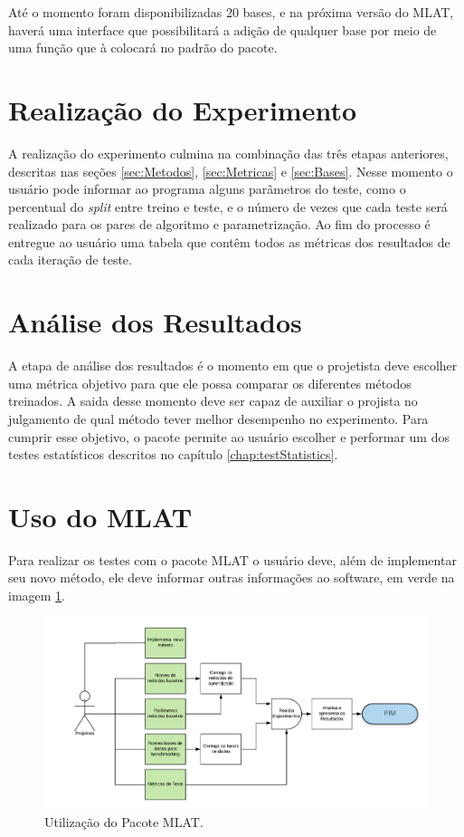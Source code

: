 Até o momento foram disponibilizadas 20 bases, e na próxima versão do MLAT, haverá uma interface que possibilitará a adição de qualquer base por meio de uma função que à colocará no padrão do pacote.

\section{Realização do Experimento}
A realização do experimento culmina na combinação das três etapas anteriores, descritas nas seções \ref{sec:Metodos}, \ref{sec:Metricas} e \ref{sec:Bases}. Nesse momento o usuário pode informar ao programa alguns parâmetros do teste, como o percentual do \textit{split} entre treino e teste, e o número de vezes que cada teste será realizado para os pares de algoritmo e parametrização. Ao fim do processo é entregue ao usuário uma tabela que contêm todos as métricas dos resultados de cada iteração de teste.

\section{Análise dos  Resultados}
A etapa de análise dos resultados é o momento em que o projetista deve escolher uma métrica objetivo para que ele possa comparar os diferentes métodos treinados. A saida desse momento deve ser capaz de auxiliar o projista no julgamento de qual método tever melhor desempenho no experimento. Para cumprir esse objetivo, o pacote permite ao usuário escolher e performar um dos testes estatísticos descritos no capítulo \ref{chap:testStatistics}. 



\section{Uso do MLAT}
Para realizar os testes com o pacote MLAT o usuário deve, além de implementar seu novo método, ele deve informar outras informações ao software, em verde na imagem \ref{fig:BuildingMLModel2}.

\begin{figure}[!h]
	\centering
	\includegraphics[width=\textwidth]{./04-figuras/UseCase.png}
	\caption{Utilização do Pacote MLAT.} 
	\label{fig:BuildingMLModel2}
\end{figure}


